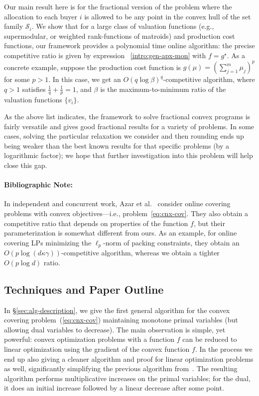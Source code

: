 \documentclass[letterpaper,11pt]{article}
\def\cS{\mathcal{S}}
\begin{document}
\begin{itemize}
  Our main result here is for the fractional version of the problem where the allocation to each buyer $i$ is allowed to be any point in the convex hull of the set family $\cS_i$. We show that for a large class of valuation functions (e.g., supermodular, or weighted rank-functions of matroids) and production cost functions, our framework provides a polynomial time online algorithm: the precise competitive ratio is given by expression ~\eqref{intro:gen-apx-mon} with $f=g^\star$. As a concrete example, suppose the production cost function is $g(\mu)=( \sum_{j=1}^m \mu_j)^p$ for some $p > 1$. In this case, we get an $O(q\log \beta)^q$-competitive algorithm, where $q>1$ satisfies $\frac1q+\frac1p=1$, and $\beta$ is the maximum-to-minimum ratio of the valuation functions $\{v_i\}$.
\end{itemize}

As the above list indicates, the framework to solve fractional convex
programs is fairly versatile and gives good fractional results for a
variety of problems. In some cases, solving the particular relaxation we
consider and then rounding ends up being weaker than the best known
results for that specific problems (by a logarithmic factor); we hope
that further investigation into this problem will help close this gap.

\paragraph{Bibliographic Note:} In independent and concurrent work,
Azar et al.~\cite{ACP14} consider online covering problems with convex
objectives---i.e., problem~\eqref{eq:cnx-cov}. They also obtain a
competitive ratio that depends on properties of the function $f$, but
their parameterization is somewhat different from ours. As an example,
for online covering LPs minimizing the $\ell_p$-norm of packing
constraints, they obtain an $O(p\log (d\kappa \gamma))$-competitive
algorithm, whereas we obtain a tighter $O(p\log d)$ ratio.

\subsection{Techniques and Paper Outline}
\label{sec:outline}

In \S\ref{sec:alg-description}, we give the first general algorithm for the
convex covering problem~(\ref{eq:cnx-cov}) maintaining monotone primal
variables (but allowing dual variables to decrease). The main
observation is simple, yet powerful: convex
optimization problems with a function $f$ can be reduced to linear optimization using the
gradient of the convex function $f$. In the process we end up also
giving a cleaner algorithm and proof for linear optimization problems
as well, significantly simplifying the previous algorithm
from~\cite{GN12-mor}.  The resulting algorithm performs multiplicative
increases on the primal variables; for the dual, it does an initial
increase followed by a linear decrease after some point.
\end{document}
